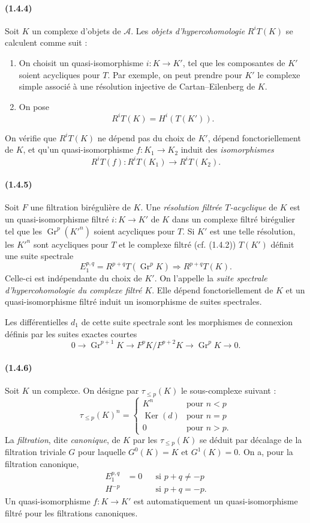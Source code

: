 \documentclass[10pt]{article}
\newcommand{\Gr}{\operatorname{Gr}}
\newcommand{\Ker}{\operatorname{Ker}}
\newcommand{\calA}{\mathcal A}
\begin{document}
\paragraph{(1.4.4)} Soit $K$ un complexe d'objets de $\calA$. Les \emph{objets d'hypercohomologie} $R^iT(K)$ se calculent comme suit :
\begin{enumerate}[label=\alph*)]
\item On choisit un quasi-isomorphisme $i:K\to K'$, tel que les composantes de $K'$ soient acycliques pour $T$. Par exemple, on peut prendre pour $K'$ le complexe simple associé à une résolution injective de Cartan--Eilenberg de $K$.
\item On pose
\[
R^iT(K)=H^i(T(K')).
\]
\end{enumerate}
On vérifie que $R^iT(K)$ ne dépend pas du choix de $K'$, dépend fonctoriellement de $K$, et qu'un quasi-isomorphisme $f:K_1\to K_2$ induit des \emph{isomorphismes}
\[
R^iT(f):R^iT(K_1)\longrightarrow R^iT(K_2).
\]

\paragraph{(1.4.5)} Soit $F$ une filtration birégulière de $K$. Une \emph{résolution filtrée $T$-acyclique} de $K$ est un quasi-isomorphisme filtré $i:K\to K'$ de $K$ dans un complexe filtré birégulier tel que les $\Gr^p(K'^n)$ soient acycliques pour $T$. Si $K'$ est une telle résolution, les $K'^n$ sont acycliques pour $T$ et le complexe filtré (cf. (1.4.2)) $T(K')$ définit une suite spectrale
\[
E_1^{p,q}=R^{p+q}T(\Gr^pK)\Rightarrow R^{p+q}T(K).
\]
Celle-ci est indépendante du choix de $K'$. On l'appelle la \emph{suite spectrale d'hypercohomologie du complexe filtré $K$}. Elle dépend fonctoriellement de $K$ et un quasi-isomorphisme filtré induit un isomorphisme de suites spectrales.

Les différentielles $d_1$ de cette suite spectrale sont les morphismes de connexion définis par les suites exactes courtes
\[
0\to\Gr^{p+1}K\to F^pK/F^{p+2}K\to\Gr^pK\to0.
\]

\paragraph{(1.4.6)} Soit $K$ un complexe. On désigne par $\tau_{\le p}(K)$ le sous-complexe suivant :
\[
\tau_{\le p}(K)^n=\begin{cases}
K^n& \text{pour }n<p\\
\Ker(d)& \text{pour }n=p\\
0& \text{pour }n>p.
\end{cases}
\]
La \emph{filtration}, dite \emph{canonique}, de $K$ par les $\tau_{\le p}(K)$ se déduit par décalage de la filtration triviale $G$ pour laquelle $G^0(K)=K$ et $G^1(K)=0$. On a, pour la filtration canonique,
\[
\begin{aligned}
E_1^{p,q}&=0 &&\text{si }p+q\ne-p\\
H^{-p} &&&\text{si }p+q=-p.
\end{aligned}
\]
Un quasi-isomorphisme $f:K\to K'$ est automatiquement un quasi-isomorphisme filtré pour les filtrations canoniques.
\end{document}
